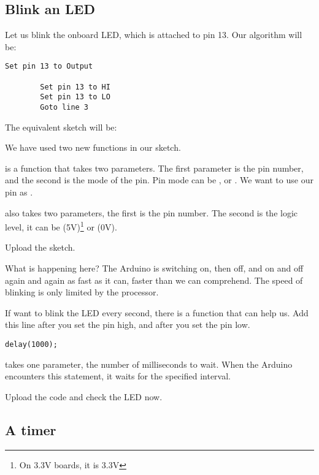 \documentclass{article}
\begin{document}
	\subsection{Blink an LED}

		Let us blink the onboard LED, which is attached to pin 13. Our algorithm will be:

		\begin{lstlisting}[gobble=8]
		Set pin 13 to Output

		Set pin 13 to HI
		Set pin 13 to LO
		Goto line 3
		\end{lstlisting}

		The equivalent sketch will be:

		

		We have used two new functions in our sketch.

		 is a function that takes two parameters. The first parameter is the pin number, and the second is the mode of the pin. Pin mode can be  ,  or . We want to use our pin as .

		 also takes two parameters, the first is the pin number. The second is the logic level, it can be  (5V)\footnote{On 3.3V boards, it is 3.3V} or  (0V).

		Upload the sketch.

		What is happening here? The Arduino is switching on, then off, and on and off again and again as fast as it can, faster than we can comprehend. The speed of blinking is only limited by the processor.

		If want to blink the LED every second, there is a function  that can help us. Add this line after you set the pin high, and after you set the pin low.

		\begin{lstlisting}[gobble=8, numbers = none]
		delay(1000);
		\end{lstlisting}

		 takes one parameter, the number of milliseconds to wait. When the Arduino encounters this statement, it waits for the specified interval. 

		Upload the code and check the LED now.

	\subsection{A timer}
\end{document}
